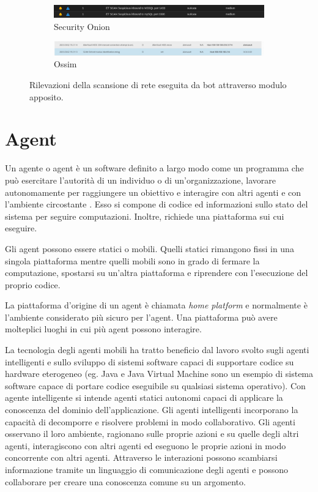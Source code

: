 \begin{figure}[hbtp]
    \centering
    \begin{subfigure}{\textwidth}
        \centering
        \includegraphics[width=\textwidth]{res/fig/byob-result-2.png}
        \caption{Security Onion}
        \label{fig:byob-result-2}
    \end{subfigure}
    \hfill
    \begin{subfigure}{\textwidth}
        \centering
        \includegraphics[width=\textwidth]{res/fig/byob-result-3.png}
        \caption{Ossim}
        \label{fig:byob-result-3}
    \end{subfigure}
    \caption{Rilevazioni della scansione di rete eseguita da bot attraverso modulo apposito.}
    \label{fig:byob-results-2-3}
\end{figure}


\chapter{Agent}
Un agente o agent è un software  definito a largo modo  come un programma che può esercitare l'autorità di un individuo o di un'organizzazione, lavorare autonomamente per raggiungere un obiettivo e interagire con altri agenti e con l'ambiente circostante \cite{jansen2002intrusion}. 
Esso si compone di codice ed informazioni sullo stato del sistema per seguire computazioni. Inoltre, richiede una piattaforma sui cui eseguire.

Gli agent possono essere statici o mobili. Quelli statici rimangono fissi in una singola piattaforma mentre quelli mobili sono in grado di fermare la computazione, spostarsi su un'altra piattaforma e riprendere con l'esecuzione del proprio codice.

La piattaforma d'origine di un agent è chiamata \textit{home platform} e normalmente è l'ambiente considerato più sicuro per l'agent.
Una piattaforma può avere molteplici luoghi in cui più agent possono interagire.

La tecnologia degli agenti mobili ha tratto beneficio dal lavoro svolto sugli agenti intelligenti e sullo sviluppo di sistemi software capaci di supportare codice su hardware eterogeneo (eg. Java e Java Virtual Machine sono un esempio di sistema software capace di portare codice eseguibile su qualsiasi sistema operativo). Con agente intelligente si intende  agenti statici autonomi capaci di applicare la conoscenza del dominio dell'applicazione. Gli agenti intelligenti incorporano la capacità di decomporre e risolvere problemi in modo collaborativo. Gli agenti osservano il loro ambiente, ragionano sulle proprie azioni e su quelle degli altri agenti, interagiscono con altri agenti ed eseguono le proprie azioni in modo concorrente con altri agenti.
 Attraverso le interazioni possono scambiarsi informazione tramite un linguaggio di comunicazione degli agenti e possono collaborare per creare una conoscenza comune su un argomento.


